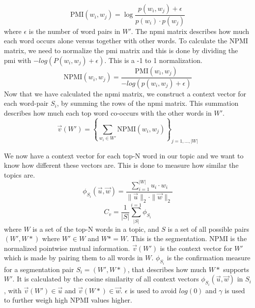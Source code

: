 \begin{equation}\label{eq:pmi}
	\text{PMI}(w_i,w_j) = \log\frac{p(w_i,w_j) + \epsilon}{p(w_i)\cdot p(w_j)}
\end{equation}
where $\epsilon$ is the number of word pairs in $W'$. 
The \gls{npmi} matrix describes how much each word occurs alone versus together with other words. 
To calculate the NPMI matrix, we need to normalize the \gls{pmi} matrix and this is done by dividing the \gls{pmi} with $-log(P(w_i,w_j) + \epsilon)$.
This is a -1 to 1 normalization.
\begin{equation}\label{eq:coherence_2}
	\text{NPMI}(w_i,w_j) =  \frac{\text{PMI}(w_i, w_j)}{-log(p(w_i,w_j) + \epsilon)}
\end{equation}
Now that we have calculated the \gls{npmi} matrix, we construct a context vector for each word-pair $S_i$, by summing the rows of the \gls{npmi} matrix.
This summation describes how much each top word co-occurs with the other words in $W'$.
\begin{equation}\label{eq:coherence_1}
	\overrightarrow{v}(W') = \left\{ \sum_{w_i \in W'} \text{NPMI}(w_i, w_j) \right\}_{j=1,\dots,|W|}
\end{equation}

We now have a context vector for each top-N word in our topic and we want to know how different these vectors are.
This is done to measure how similar the topics are.
\begin{equation}\label{eq:coherence_3}
	\phi_{S_i}(\overrightarrow{u}, \overrightarrow{w}) = \frac
	{\sum_{i = 1}^{|W|} u_i \cdot w_i}
	{\|\overrightarrow{u}\|_2 \cdot \|\overrightarrow{w}\|_2}
\end{equation}
\begin{equation}\label{eq:coherence_4}
	C_v = \frac{1}{|S|}\sum_{|S|}^{i=1}\phi_{S_i}
\end{equation}
\noindent where $W$ is a set of the top-N words in a topic, and $S$ is a set of all possible pairs $(W',W*)$ where $W'\in W$ and $W* = W$.
This is the segmentation.
NPMI is the normalized pointwise mutual information.
$\overrightarrow{v}(W')$ is the context vector for $W'$ which is made by pairing them to all words in $W$.
$\phi_{S_i}$ is the confirmation measure for a segmentation pair $S_i = (W',W*)$, that describes how much $W*$ supports $W'$.
It is calculated by the cosine similarity of all context vectors $\phi_{S_i}(\overrightarrow{u},\overrightarrow{w})$ in $S_i$, with $\overrightarrow{v}(W') \in \overrightarrow{u}$ and $\overrightarrow{v}(W*) \in \overrightarrow{w}$.
$\epsilon$ is used to avoid $log(0)$ and $\gamma$ is used to further weigh high NPMI values higher.

